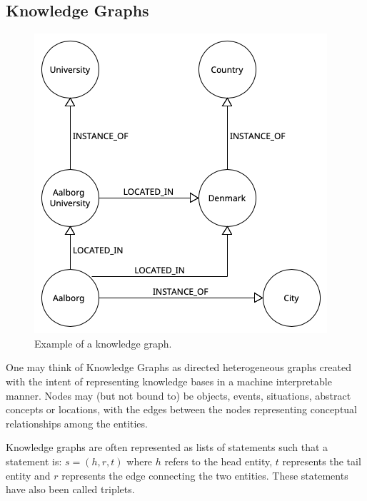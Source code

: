 \pagebreak

\subsection{Knowledge Graphs}\label{subsec:introduction-knowledge-graphs}

\begin{figure} %
    \centering
    \includegraphics[width=\linewidth, scale=0.5]{figures/kg-example}
    \caption{Example of a knowledge graph.}
    \label{fig:kg-example}
\end{figure}
One may think of Knowledge Graphs as directed heterogeneous graphs
created with the intent of representing knowledge bases in a machine interpretable manner.
Nodes may (but not bound to) be objects, events, situations, abstract concepts or locations,
with the edges between the nodes representing conceptual relationships among the entities.

Knowledge graphs are often represented as lists of statements such that a statement is: $s = (h,r,t)$
where $h$ refers to the head entity, $t$ represents the tail entity and $r$ represents the
edge connecting the two entities.
These statements have also been called triplets.

